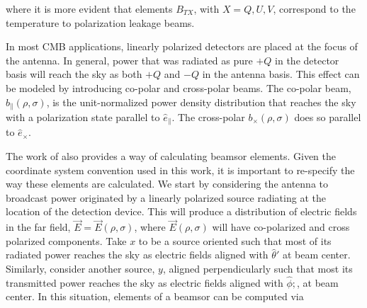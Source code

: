 \documentclass[a4paper,fleqn]{cas-dc}\sloppy
\newcommand{\co}{\mathbin{\|}}
\newcommand{\cx}{\mathbin{\times}}
\begin{document}
\noindent
where it is more evident that elements $B_{TX}$, with $X=Q,U,V$, correspond to the temperature to polarization leakage beams. 

In most CMB applications, linearly polarized detectors are placed at the focus of the antenna. In general, power that was radiated as pure $+Q$ in the detector basis will reach the sky as both $+Q$ and $-Q$ in the antenna basis. This effect can be modeled by introducing co-polar and cross-polar beams. The co-polar beam, $b_{\co}(\rho,\sigma)$, is the unit-normalized power density distribution that reaches the sky with a polarization state parallel to $\hat{e}_{\co}$. The cross-polar $b_{\cx}(\rho,\sigma)$ does so parallel to $\hat{e}_{\cx}$. 

The work of \cite{2007A&A...470..771J} also provides a way of calculating beamsor elements. Given the coordinate system convention used in this work, it is important to re-specify the way these elements are calculated. We start by considering the antenna to broadcast power originated by a linearly polarized source radiating at the location of the detection device. This will produce a distribution of electric fields in the far field, $\vec{E} = \vec{E}(\rho,\sigma)$, where $\vec{E}(\rho,\sigma)$ will have co-polarized and cross polarized components. Take $x$ to be a source oriented such that most of its radiated power reaches the sky as electric fields aligned with $\hat{\theta}'$ at beam center. Similarly, consider another source, $y$, aligned perpendicularly such that most its transmitted power reaches the sky as electric fields aligned with $\hat{\phi};$, at beam center. In this situation, elements of a beamsor can be computed via
\end{document}
